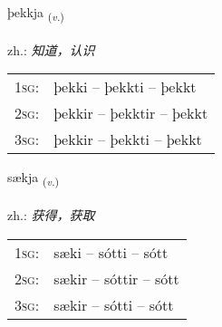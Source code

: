 \documentclass[frontgrid, backgrid]{flacards}\usepackage[]{graphicx}\usepackage[]{xcolor}
\begin{document}
\renewcommand{\flhead}{\vskip5pt \fboxsep=0pt {\small\bfseries\footnotesize Sagnorð | 动词}}
\renewcommand{\fcfoot}{\vskip5pt \fboxsep=0pt \hspace{2pt}{\small\bfseries\footnotesize 1K}}

\renewcommand{\blhead}{\vskip5pt {\small\bfseries\footnotesize Sagnorð | 动词 }}
\renewcommand{\bcfoot}{\vskip5pt \hspace{2pt}{\small\bfseries\footnotesize 1K}}


{þekkja \small{\textsubscript{(\textit{v.})}} \\[1ex] %
\textphonetic{[θɛhca]} \\
zh.: \emph{知道，认识} \\  [2ex]
\renewcommand*{\arraystretch}{0.8}
\begin{tabular}{p{1cm}l}
\textsc{1sg}: & þekki -- þekkti -- þekkt \\ 
\textsc{2sg}: & þekkir -- þekktir -- þekkt \\ 
\textsc{3sg}: & þekkir -- þekkti -- þekkt \\ 
\end{tabular}
}

\renewcommand{\flhead}{\vskip5pt \fboxsep=0pt {\small\bfseries\footnotesize Sagnorð | 动词}}
\renewcommand{\fcfoot}{\vskip5pt \fboxsep=0pt \hspace{2pt}{\small\bfseries\footnotesize 1K}}

\renewcommand{\blhead}{\vskip5pt {\small\bfseries\footnotesize Sagnorð | 动词 }}
\renewcommand{\bcfoot}{\vskip5pt \hspace{2pt}{\small\bfseries\footnotesize 1K}}


{sækja \small{\textsubscript{(\textit{v.})}} \\[1ex] %
\textphonetic{[saiːca]} \\
zh.: \emph{获得，获取} \\  [2ex]
\renewcommand*{\arraystretch}{0.8}
\begin{tabular}{p{1cm}l}
\textsc{1sg}: & sæki -- sótti -- sótt \\ 
\textsc{2sg}: & sækir -- sóttir -- sótt \\ 
\textsc{3sg}: & sækir -- sótti -- sótt \\ 
\end{tabular}
}
\end{document}
